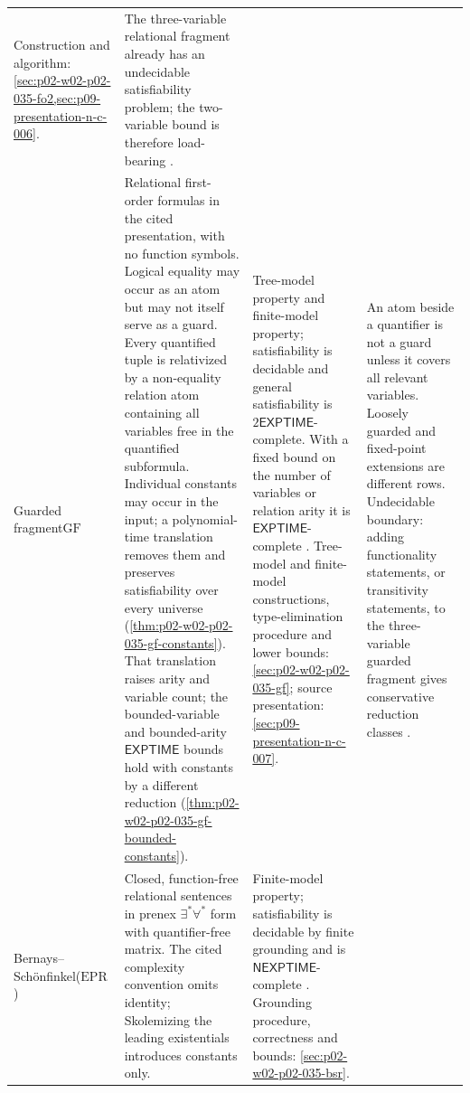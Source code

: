 \begin{landscape}
\begin{longtable}{@{}p{.90in}p{2.20in}p{2.10in}p{2.00in}@{}}
Construction and algorithm:
\cref{sec:p02-w02-p02-035-fo2,sec:p09-presentation-n-c-006}. &
The three-variable relational fragment already has an undecidable
satisfiability problem; the two-variable bound is therefore load-bearing
\cite{GradelKolaitisVardi1997}. \\
\addlinespace
Guarded fragment\newline\(\mathrm{GF}\)
\index{guarded fragment} &
Relational first-order formulas in the cited presentation, with no function
symbols.  Logical equality may occur as an atom but may not itself serve as a
guard.  Every quantified tuple is relativized by a non-equality relation atom
containing all variables free in the quantified subformula.
Individual constants may occur in the input; a polynomial-time translation
removes them and preserves satisfiability over every universe
\cite[lem.~2.3]{Gradel1999} (\cref{thm:p02-w02-p02-035-gf-constants}).
That translation raises arity and variable count; the bounded-variable and
bounded-arity \(\mathsf{EXPTIME}\) bounds hold with constants by a different
reduction (\cref{thm:p02-w02-p02-035-gf-bounded-constants}). &
Tree-model property and finite-model property; satisfiability is decidable and
general satisfiability is \(2\mathsf{EXPTIME}\)-complete.  With a fixed bound
on the number of variables or relation arity it is
\(\mathsf{EXPTIME}\)-complete \cite{Gradel1999}.
Tree-model and finite-model constructions, type-elimination procedure and
lower bounds: \cref{sec:p02-w02-p02-035-gf}; source presentation:
\cref{sec:p09-presentation-n-c-007}. &
An atom beside a quantifier is not a guard unless it covers all relevant
variables.  Loosely guarded and fixed-point extensions are different rows.
Undecidable boundary: adding functionality statements, or transitivity
statements, to the three-variable guarded fragment gives conservative
reduction classes \cite[thms.~5.8 and 5.10]{Gradel1999}. \\
\addlinespace
Bernays--Sch\"onfinkel\newline(\(\mathrm{EPR}\))
\index{Bernays--Schonfinkel class@Bernays--Sch\"onfinkel class}
\index{effectively propositional logic} &
Closed, function-free relational sentences in prenex
\(\exists^{*}\forall^{*}\) form with quantifier-free matrix.  The cited
complexity convention omits identity; Skolemizing the leading existentials
introduces constants only. &
Finite-model property; satisfiability is decidable by finite grounding and is
\(\mathsf{NEXPTIME}\)-complete \cite{Lewis1980}.
Grounding procedure, correctness and bounds:
\cref{sec:p02-w02-p02-035-bsr}. &

\end{longtable}
\end{landscape}
